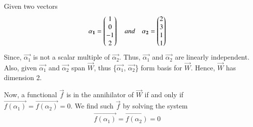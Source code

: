 \documentclass[journal,12pt,twocolumn]{IEEEtran}
\begin{document}
Given two vectors 
\begin{align}
\mathbf{\alpha_1} = \begin{pmatrix}1 \\ 0 \\ -1 \\ 2\end{pmatrix} \quad and \quad \mathbf{\alpha_2} = \begin{pmatrix}2 \\ 3 \\ 1 \\ 1\end{pmatrix}
\end{align}
Since, $\vec{\alpha_1}$ is not a scalar multiple of $\vec{\alpha_2}$. Thus, $\vec{\alpha_1}$ and $\vec{\alpha_2}$ are linearly independent. Also, given $\vec{\alpha_1}$ and $\vec{\alpha_2}$ span $\vec{W}$, thus \{$\vec{\alpha_1}$, $\vec{\alpha_2}$\} form basis for $\vec{W}$. Hence, $\vec{W}$ has dimension 2.

Now, a functional $\vec{f}$ is in the annihilator of $\vec{W}$ if and only if $\vec{f(\alpha_1)} = \vec{f(\alpha_2)} = 0$. We find such $\vec{f}$ by solving the system 
\begin{align}
\vec{f(\alpha_1)} = \vec{f(\alpha_2)} = 0 \label{4}
\end{align}
\end{document}
